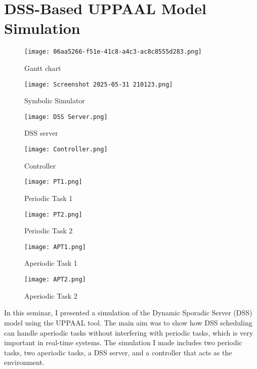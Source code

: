 \documentclass[conference]{IEEEtran}
\begin{document}
\section{DSS-Based UPPAAL Model Simulation}
\begin{figure}
    \centering
    \texttt{[image: 06aa5266-f51e-41c8-a4c3-ac8c8555d283.png]}
    \caption{Gantt chart}
    \label{fig:enter-label}
\end{figure}
\begin{figure}
    \centering
    \texttt{[image: Screenshot 2025-05-31 210123.png]}
    \caption{Symbolic Simulator}
    \label{fig:enter-label}
\end{figure}
\begin{figure}
    \centering
    \texttt{[image: DSS Server.png]}
    \caption{DSS server}
    \end{figure}
\begin{figure}
    \centering
    \texttt{[image: Controller.png]}
    \caption{Controller}
        \label{fig:enter-label}
\end{figure}
 \begin{figure}
        \centering
        \texttt{[image: PT1.png]}
        \caption{Periodic Task 1}
         \label{fig:enter-label}
    \end{figure}
\begin{figure}
            \centering
            \texttt{[image: PT2.png]}
            \caption{Periodic Task 2}
             \label{fig:enter-label}
        \end{figure}
\begin{figure}
                \centering
                \texttt{[image: APT1.png]}
                \caption{Aperiodic Task 1}
                \label{fig:enter-label}
            \end{figure}
            \begin{figure}
    \centering
    \texttt{[image: APT2.png]}
    \caption{Aperiodic Task 2}
    \label{fig:enter-label}
\end{figure}
In this seminar, I presented a simulation of the Dynamic Sporadic Server (DSS) model using the UPPAAL tool. The main aim was to show how DSS scheduling can handle aperiodic tasks without interfering with periodic tasks, which is very important in real-time systems. The simulation I made includes two periodic tasks, two aperiodic tasks, a DSS server, and a controller that acts as the environment.
\end{document}
